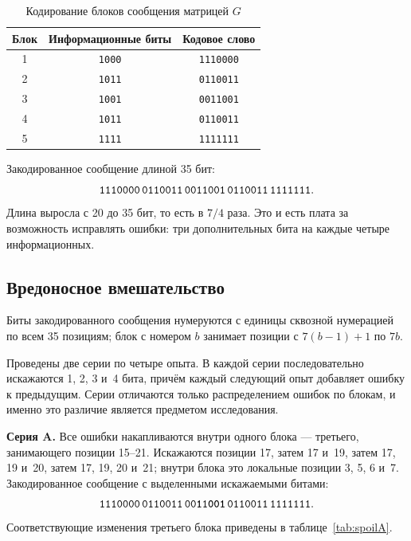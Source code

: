 \documentclass[a4paper,14pt]{extarticle}
\begin{document}
\begin{table}[H]
\caption{Кодирование блоков сообщения матрицей $G$}
\label{tab:blocks3}
\centering\footnotesize\setlength{\tabcolsep}{8pt}
\begin{tabular}{c|c|c}
\toprule
Блок & Информационные биты & Кодовое слово \\
\midrule
1 & \texttt{1000} & \texttt{1110000} \\
2 & \texttt{1011} & \texttt{0110011} \\
3 & \texttt{1001} & \texttt{0011001} \\
4 & \texttt{1011} & \texttt{0110011} \\
5 & \texttt{1111} & \texttt{1111111} \\
\bottomrule
\end{tabular}
\end{table}

Закодированное сообщение длиной 35 бит:
\begin{equation}
  \texttt{1110000\,0110011\,0011001\,0110011\,1111111}.
  \label{eq:coded35}
\end{equation}
Длина выросла с 20 до 35 бит, то есть в $7/4$ раза. Это и есть плата за возможность
исправлять ошибки: три дополнительных бита на каждые четыре информационных.

\subsection{Вредоносное вмешательство}

Биты закодированного сообщения нумеруются с единицы сквозной нумерацией по всем 35
позициям; блок с номером $b$ занимает позиции с $7(b-1)+1$ по $7b$.

Проведены две серии по четыре опыта. В каждой серии последовательно искажаются 1, 2,
3 и~4 бита, причём каждый следующий опыт добавляет ошибку к предыдущим. Серии
отличаются только распределением ошибок по блокам, и именно это различие является
предметом исследования.

\textbf{Серия A.} Все ошибки накапливаются внутри одного блока --- третьего,
занимающего позиции 15--21. Искажаются позиции 17, затем 17 и~19, затем 17, 19 и~20,
затем 17, 19, 20 и~21; внутри блока это локальные позиции 3, 5, 6 и~7. Закодированное
сообщение с выделенными искажаемыми битами:
\begin{equation}
  \texttt{1110000\,0110011\,00\textbf{1}1\textbf{001}\,0110011\,1111111}.
\end{equation}
Соответствующие изменения третьего блока приведены в таблице~\ref{tab:spoilA}.
\end{document}
